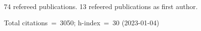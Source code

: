 74 refereed publications. 13 refeered publications as first author.

Total citations~=~3050; h-index~=~30 (2023-01-04)